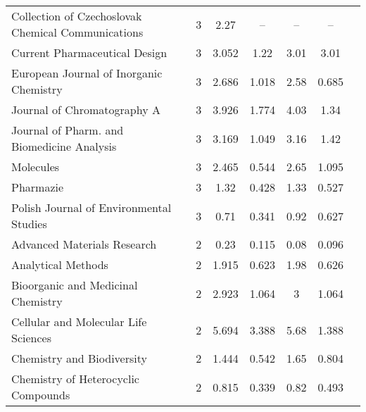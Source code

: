 {{\begin{longtable}[c]{lcccccc}
  Collection of Czechoslovak Chemical Communications                                 & 3      & 2.27    & --   &   --        & --                    \\
 Current Pharmaceutical Design                                                      & 3      & 3.052   & 1.22  &  3.01      & 3.01                  \\[1ex]
 European Journal of Inorganic Chemistry                                            & 3      & 2.686   & 1.018 &  2.58      & 0.685                 \\
 Journal of Chromatography A                                                        & 3      & 3.926   & 1.774 &  4.03      & 1.34                  \\
 Journal of Pharm. and Biomedicine Analysis                                         & 3      & 3.169   & 1.049 &  3.16      & 1.42                  \\
 Molecules                                                                          & 3      & 2.465   & 0.544 &  2.65      & 1.095                 \\
 Pharmazie                                                                          & 3      & 1.32    & 0.428 &  1.33      & 0.527                 \\[1ex]
 Polish Journal of Environmental Studies                                            & 3      & 0.71    & 0.341 &  0.92      & 0.627                 \\
 Advanced Materials Research                                                        & 2      & 0.23    & 0.115 &  0.08      & 0.096                 \\
 Analytical Methods                                                                 & 2      & 1.915   & 0.623 &  1.98      & 0.626                 \\
 Bioorganic and Medicinal Chemistry                                                 & 2      & 2.923   & 1.064 &  3         & 1.064                 \\
 Cellular and Molecular Life Sciences                                               & 2      & 5.694   & 3.388 &  5.68      & 1.388                 \\[1ex]
 Chemistry and Biodiversity                                                         & 2      & 1.444   & 0.542 &  1.65      & 0.804                 \\
 Chemistry of Heterocyclic Compounds                                                & 2      & 0.815   & 0.339 &  0.82      & 0.493                 \\

\end{longtable}}}
